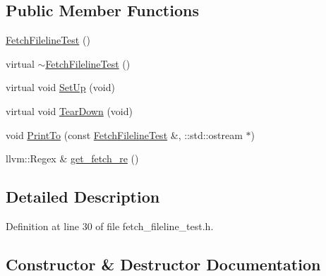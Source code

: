 \subsection*{Public Member Functions}
\begin{DoxyCompactItemize}
\item 
\hyperlink{classclang_1_1tidy_1_1pagesjaunes_1_1test_1_1_fetch_fileline_test_a15fa0349a98e54886557b3a3398daa06}{Fetch\+Fileline\+Test} ()
\item 
virtual \hyperlink{classclang_1_1tidy_1_1pagesjaunes_1_1test_1_1_fetch_fileline_test_aaeed767bf6d6fbe17e538cd4984dccb3}{$\sim$\+Fetch\+Fileline\+Test} ()
\item 
virtual void \hyperlink{classclang_1_1tidy_1_1pagesjaunes_1_1test_1_1_fetch_fileline_test_ac285b9978e5990458a05b4f7605074aa}{Set\+Up} (void)
\item 
virtual void \hyperlink{classclang_1_1tidy_1_1pagesjaunes_1_1test_1_1_fetch_fileline_test_a5fae484f2916c11ae5477cdd86fa348e}{Tear\+Down} (void)
\item 
void \hyperlink{classclang_1_1tidy_1_1pagesjaunes_1_1test_1_1_fetch_fileline_test_acc3b4dfdaeb13ef85054d29057d7f3e7}{Print\+To} (const \hyperlink{classclang_1_1tidy_1_1pagesjaunes_1_1test_1_1_fetch_fileline_test}{Fetch\+Fileline\+Test} \&, \+::std\+::ostream $\ast$)
\item 
llvm\+::\+Regex \& \hyperlink{classclang_1_1tidy_1_1pagesjaunes_1_1test_1_1_fetch_fileline_test_ab098b84f30e24c2158941c40a8b41a19}{get\+\_\+fetch\+\_\+re} ()
\end{DoxyCompactItemize}


\subsection{Detailed Description}


Definition at line 30 of file fetch\+\_\+fileline\+\_\+test.\+h.



\subsection{Constructor \& Destructor Documentation}
\mbox{\label{classclang_1_1tidy_1_1pagesjaunes_1_1test_1_1_fetch_fileline_test_a15fa0349a98e54886557b3a3398daa06}} 
